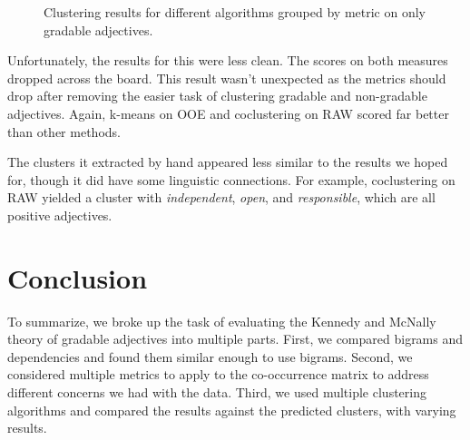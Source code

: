 \documentclass[11pt]{amsart}
\begin{document}
\begin{figure}
	\caption{Clustering results for different algorithms grouped by metric on only gradable adjectives.}
\end{figure}

Unfortunately, the results for this were less clean. The scores on both measures dropped across the board. This result wasn't unexpected as the metrics should drop after removing the easier task of clustering gradable and non-gradable adjectives. Again, k-means on OOE and coclustering on RAW scored far better than other methods.

The clusters it extracted by hand appeared less similar to the results we hoped for, though it did have some linguistic connections. For example, coclustering on RAW yielded a cluster with \textit{independent}, \textit{open}, and \textit{responsible}, which are all positive adjectives.

\section{Conclusion}
To summarize, we broke up the task of evaluating the Kennedy and McNally theory of gradable adjectives into multiple parts. First, we compared bigrams and dependencies and found them similar enough to use bigrams. Second, we considered multiple metrics to apply to the co-occurrence matrix to address different concerns we had with the data. Third, we used multiple clustering algorithms and compared the results against the predicted clusters, with varying results.
\end{document}

